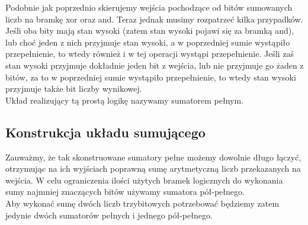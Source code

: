 \documentclass{article}
\begin{document}
            Podobnie jak poprzednio skierujemy wejścia pochodzące od bitów sumowanych liczb na bramkę xor oraz and. Teraz jednak musimy rozpatrzeć kilka przypadków. Jeśli oba bity mają stan wysoki (zatem stan wysoki pojawi się za bramką and), lub choć jeden z nich przyjmuje stan wysoki, a w poprzedniej sumie wystąpiło przepełnienie, to wtedy również i w tej operacji wystąpi przepełnienie. Jeśli zaś stan wysoki przyjmuje dokładnie jeden bit z wejścia, lub nie przyjmuje go żaden z bitów, za to w poprzedniej sumie wystąpiło przepełnienie, to wtedy stan wysoki przyjmuje także bit liczby wynikowej.\\
            Układ realizujący tą prostą logikę nazywamy sumatorem pełnym.
            \FloatBarrier
        
        \subsection{Konstrukcja układu sumującego}
            Zauważmy, że tak skonstruowane sumatory pełne możemy dowolnie długo łączyć, otrzymując na ich wyjściach poprawną sumę arytmetyczną liczb przekazanych na wejścia. W celu ograniczenia ilości użytych bramek logicznych do wykonania sumy najmniej znaczących bitów używamy sumatora pół-pełnego.\\ 
            Aby wykonać sumę dwóch liczb trzybitowych potrzebować będziemy zatem jedynie dwóch sumatorów pełnych i jednego pół-pełnego.
\end{document}
